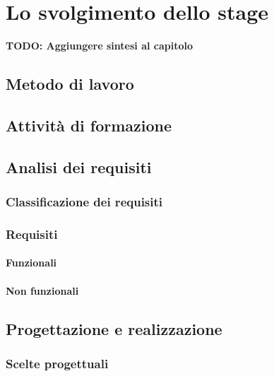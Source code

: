 
\chapter{Lo svolgimento dello stage}
\label{cap:svolgimento-stage}

\textbf{TODO: Aggiungere sintesi al capitolo}\\


\section{Metodo di lavoro}

\section{Attività di formazione}

\section{Analisi dei requisiti}
\subsection{Classificazione dei requisiti}
\subsection{Requisiti}
\subsubsection{Funzionali}
\subsubsection{Non funzionali}


\section{Progettazione e realizzazione}

\subsection{Scelte progettuali}

